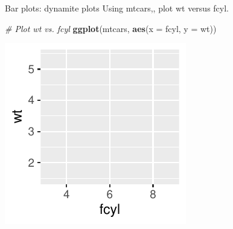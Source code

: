 \documentclass[
  ignorenonframetext,
]{beamer}
\newenvironment{Shaded}{\begin{snugshade}}{\end{snugshade}}
\newcommand{\AttributeTok}[1]{\textcolor[rgb]{0.13,0.29,0.53}{#1}}
\newcommand{\CommentTok}[1]{\textcolor[rgb]{0.56,0.35,0.01}{\textit{#1}}}
\newcommand{\FunctionTok}[1]{\textcolor[rgb]{0.13,0.29,0.53}{\textbf{#1}}}
\newcommand{\NormalTok}[1]{#1}
\begin{document}
\begin{frame}[fragile]{Bar plots: dynamite plots}
\label{bar-plots-dynamite-plots-2}
Using mtcars,, plot wt versus fcyl.


\begin{Shaded}
\begin{Highlighting}[]
\CommentTok{\# Plot wt vs. fcyl}
\FunctionTok{ggplot}\NormalTok{(mtcars, }\FunctionTok{aes}\NormalTok{(}\AttributeTok{x =}\NormalTok{ fcyl, }\AttributeTok{y =}\NormalTok{ wt))}
\end{Highlighting}
\end{Shaded}

\begin{center}\includegraphics[width=0.5\linewidth]{Figs/unnamed-chunk-102-1} \end{center}
\end{frame}
\end{document}
